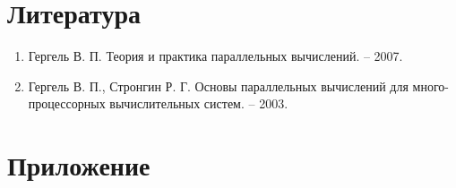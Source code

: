 \documentclass{report}
\begin{document}
\newpage

\section*{Литература}
\begin{enumerate}
\item Гергель В. П. Теория и практика параллельных вычислений. – 2007.
\item  Гергель В. П., Стронгин Р. Г. Основы параллельных вычислений для много-
процессорных вычислительных систем. – 2003.
\end{enumerate} 
\newpage

\section*{Приложение}
\end{document}
